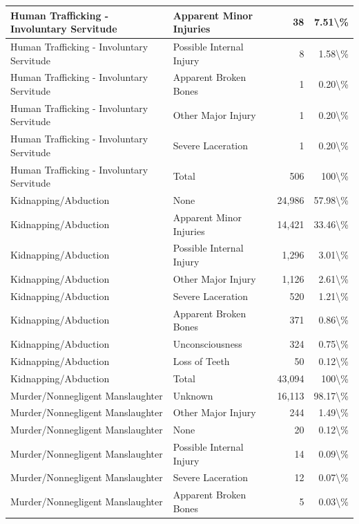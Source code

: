 \documentclass[
]{krantz}
\begin{document}
\begin{longtable}[t]{l|l|r|r}
\hline
Human Trafficking - Involuntary Servitude & Apparent Minor Injuries & 38 & 7.51\textbackslash{}\%\\
\hline
Human Trafficking - Involuntary Servitude & Possible Internal Injury & 8 & 1.58\textbackslash{}\%\\
\hline
Human Trafficking - Involuntary Servitude & Apparent Broken Bones & 1 & 0.20\textbackslash{}\%\\
\hline
Human Trafficking - Involuntary Servitude & Other Major Injury & 1 & 0.20\textbackslash{}\%\\
\hline
Human Trafficking - Involuntary Servitude & Severe Laceration & 1 & 0.20\textbackslash{}\%\\
\hline
Human Trafficking - Involuntary Servitude & Total & 506 & 100\textbackslash{}\%\\
\hline
Kidnapping/Abduction & None & 24,986 & 57.98\textbackslash{}\%\\
\hline
Kidnapping/Abduction & Apparent Minor Injuries & 14,421 & 33.46\textbackslash{}\%\\
\hline
Kidnapping/Abduction & Possible Internal Injury & 1,296 & 3.01\textbackslash{}\%\\
\hline
Kidnapping/Abduction & Other Major Injury & 1,126 & 2.61\textbackslash{}\%\\
\hline
Kidnapping/Abduction & Severe Laceration & 520 & 1.21\textbackslash{}\%\\
\hline
Kidnapping/Abduction & Apparent Broken Bones & 371 & 0.86\textbackslash{}\%\\
\hline
Kidnapping/Abduction & Unconsciousness & 324 & 0.75\textbackslash{}\%\\
\hline
Kidnapping/Abduction & Loss of Teeth & 50 & 0.12\textbackslash{}\%\\
\hline
Kidnapping/Abduction & Total & 43,094 & 100\textbackslash{}\%\\
\hline
Murder/Nonnegligent Manslaughter & Unknown & 16,113 & 98.17\textbackslash{}\%\\
\hline
Murder/Nonnegligent Manslaughter & Other Major Injury & 244 & 1.49\textbackslash{}\%\\
\hline
Murder/Nonnegligent Manslaughter & None & 20 & 0.12\textbackslash{}\%\\
\hline
Murder/Nonnegligent Manslaughter & Possible Internal Injury & 14 & 0.09\textbackslash{}\%\\
\hline
Murder/Nonnegligent Manslaughter & Severe Laceration & 12 & 0.07\textbackslash{}\%\\
\hline
Murder/Nonnegligent Manslaughter & Apparent Broken Bones & 5 & 0.03\textbackslash{}\%\\

\end{longtable}
\end{document}
